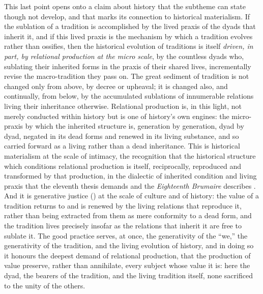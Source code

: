 This last point opens onto a claim about history that the subtheme can state though not develop, and that marks its connection to historical materialism. If the sublation of a tradition is accomplished by the lived praxis of the dyads that inherit it, and if this lived praxis is the mechanism by which a tradition evolves rather than ossifies, then the historical evolution of traditions is itself \emph{driven, in part, by relational production at the micro scale}, by the countless dyads who, sublating their inherited forms in the praxis of their shared lives, incrementally revise the macro-tradition they pass on. The great sediment of tradition is not changed only from above, by decree or upheaval; it is changed also, and continually, from below, by the accumulated sublations of innumerable relations living their inheritance otherwise. Relational production is, in this light, not merely conducted within history but is one of history's own engines: the micro-praxis by which the inherited structure is, generation by generation, dyad by dyad, negated in its dead forms and renewed in its living substance, and so carried forward as a living rather than a dead inheritance. This is historical materialism at the scale of intimacy, the recognition that the historical structure which conditions relational production is itself, reciprocally, reproduced and transformed by that production, in the dialectic of inherited condition and living praxis that the eleventh thesis demands and the \emph{Eighteenth Brumaire} describes \parencite{marx1992,marx1963}. And it is generative justice (\cite{eglash2016}) at the scale of culture and of history: the value of a tradition returns to and is renewed by the living relations that reproduce it, rather than being extracted from them as mere conformity to a dead form, and the tradition lives precisely insofar as the relations that inherit it are free to sublate it. The good practice serves, at once, the generativity of the ``we,'' the generativity of the tradition, and the living evolution of history, and in doing so it honours the deepest demand of relational production, that the production of value preserve, rather than annihilate, every subject whose value it is: here the dyad, the bearers of the tradition, and the living tradition itself, none sacrificed to the unity of the others.
